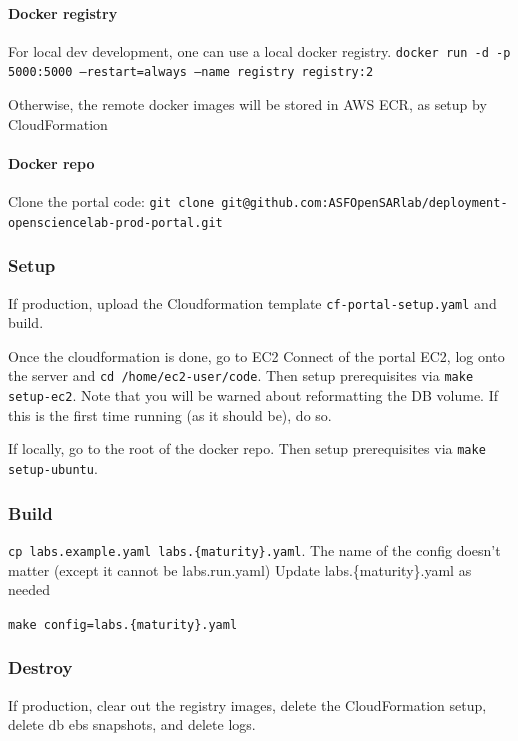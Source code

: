 \paragraph{Docker registry}

For local dev development, one can use a local docker registry.
\texttt{docker run -d -p 5000:5000 --restart=always --name registry registry:2}

Otherwise, the remote docker images will be stored in AWS ECR, as setup by CloudFormation

\paragraph{Docker repo}

Clone the portal code: \texttt{git clone git@github.com:ASFOpenSARlab/deployment-opensciencelab-prod-portal.git}

\subsubsection{Setup}

If production, upload the Cloudformation template \texttt{cf-portal-setup.yaml} and build.

Once the cloudformation is done, go to EC2 Connect of the portal EC2, log onto the server and \texttt{cd /home/ec2-user/code}.
Then setup prerequisites via \texttt{make setup-ec2}.
Note that you will be warned about reformatting the DB volume. If this is the first time running (as it should be), do so.

If locally, go to the root of the docker repo.
Then setup prerequisites via \texttt{make setup-ubuntu}.

\subsubsection{Build}

\texttt{cp labs.example.yaml labs.\{maturity\}.yaml}. The name of the config doesn't matter (except it cannot be labs.run.yaml)
Update labs.\{maturity\}.yaml as needed

\texttt{make config=labs.\{maturity\}.yaml}

\subsubsection{Destroy}

If production, clear out the registry images, delete the CloudFormation setup, delete db ebs snapshots, and delete logs.

